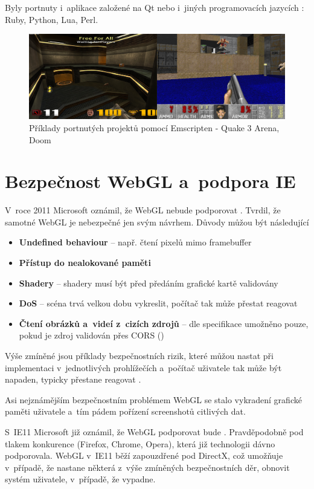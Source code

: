 \documentclass[12pt,a4paper,titlepage,final]{report}
\begin{document}
Byly portnuty i~aplikace založené na Qt nebo i~jiných programovacích jazycích \cite{portex}: Ruby, Python, Lua, Perl.

\begin{figure}[ht]
\begin{center}
\includegraphics[width=14cm]{images/quakedoom.jpg}
\caption{Příklady portnutých projektů pomocí Emscripten - Quake 3 Arena, Doom}
\label{fig:theory}
\end{center}
\end{figure}

\section{Bezpečnost WebGL a~podpora IE}

V~roce 2011 Microsoft oznámil, že WebGL nebude podporovat \cite{arstechnica}. Tvrdil, že samotné WebGL je nebezpečné jen svým návrhem. Důvody můžou být následující

\begin{itemize}
	\item \textbf{Undefined behaviour} -- např. čtení pixelů mimo framebuffer
	\item \textbf{Přístup do nealokované paměti}
	\item \textbf{Shadery} -- shadery musí být před předáním grafické kartě validovány
	\item \textbf{DoS} -- scéna trvá velkou dobu vykreslit, počítač tak může přestat reagovat
	\item \textbf{Čtení obrázků a~videí z~cizích zdrojů} -- dle specifikace umožněno pouze, pokud je zdroj validován přes CORS (\cite{cors})
\end{itemize}

Výše zmíněné jsou příklady bezpečnostních rizik, které můžou nastat při implementaci v~jednotlivých prohlížečích a~počítač uživatele tak může být napaden, typicky přestane reagovat \cite{security}.

Asi nejznámějším bezpečnostním problémem WebGL se stalo vykradení grafické paměti uživatele \cite{gstealing} a~tím pádem pořízení screenshotů citlivých dat.

S~IE11 Microsoft již oznámil, že WebGL podporovat bude \cite{ie11}. Pravděpodobně pod tlakem konkurence (Firefox, Chrome, Opera), která již technologii dávno podporovala. WebGL v~IE11 běží zapouzdřené pod DirectX, což umožňuje v~případě, že nastane některá z~výše zmíněných bezpečnostních děr, obnovit systém uživatele, v~případě, že vypadne.
	



\nocite{comparison}
\nocite{comparison2d}
\nocite{comparison-book}
\nocite{choose-api}
\nocite{engines}


\hypertarget{bib}{}

\end{document}
